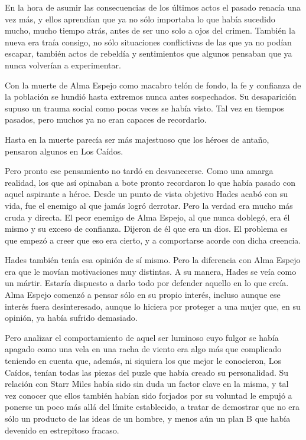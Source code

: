 En la hora de asumir las consecuencias de los últimos actos el pasado renacía una vez más, y ellos aprendían que ya no sólo importaba lo que había sucedido mucho, mucho tiempo atrás, antes de ser uno solo a ojos del crimen. También la nueva era traía consigo, no sólo situaciones conflictivas de las que ya no podían escapar, también actos de rebeldía y sentimientos que algunos pensaban que ya nunca volverían a experimentar.

\fancyparbreak
Con la muerte de Alma Espejo como macabro telón de fondo, la fe y confianza de la población se hundió hasta extremos nunca antes sospechados. Su desaparición supuso un trauma social como pocas veces se había visto. Tal vez en tiempos pasados, pero muchos ya no eran capaces de recordarlo.

Hasta en la muerte parecía ser más majestuoso que los héroes de antaño, pensaron algunos en Los Caídos.

Pero pronto ese pensamiento no tardó en desvanecerse. Como una amarga realidad, los que así opinaban a bote pronto recordaron lo que había pasado con aquel aspirante a héroe. Desde un punto de vista objetivo Hades acabó con su vida, fue el enemigo al que jamás logró derrotar. Pero la verdad era mucho más cruda y directa. El peor enemigo de Alma Espejo, al que nunca doblegó, era él mismo y su exceso de confianza. Dijeron de él que era un dios. El problema es que empezó a creer que eso era cierto, y a comportarse acorde con dicha creencia.

Hades también tenía esa opinión de sí mismo. Pero la diferencia con Alma Espejo era que le movían motivaciones muy distintas. A su manera, Hades se veía como un mártir. Estaría dispuesto a darlo todo por defender aquello en lo que creía. Alma Espejo comenzó a pensar sólo en su propio interés, incluso aunque ese interés fuera desinteresado, aunque lo hiciera por proteger a una mujer que, en su opinión, ya había sufrido demasiado.

Pero analizar el comportamiento de aquel ser luminoso cuyo fulgor se había apagado como una vela en una racha de viento era algo más que complicado teniendo en cuenta que, además, ni siquiera los que mejor le conocieron, Los Caídos, tenían todas las piezas del puzle que había creado su personalidad. Su relación con Starr Miles había sido sin duda un factor clave en la misma, y tal vez conocer que ellos también habían sido forjados por su voluntad le empujó a ponerse un poco más allá del límite establecido, a tratar de demostrar que no era sólo un producto de las ideas de un hombre, y menos aún un plan B que había devenido en estrepitoso fracaso.

